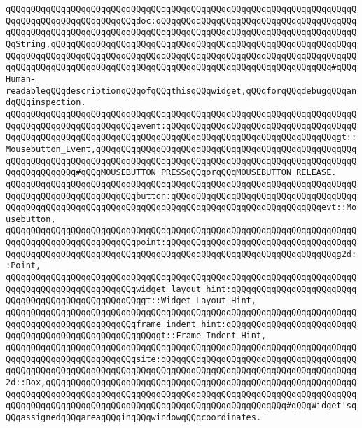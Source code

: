 \verb|qQQqqQQqqQQqqQQqqQQqqQQqqQQqqQQqqQQqqQQqqQQqqQQqqQQqqQQqqQQqqQQqqQQqqQQqqQQqqQQqqQQqqQQqqQQqqQQqdoc:qQQqqQQqqQQqqQQqqQQqqQQqqQQqqQQqqQQqqQQqqQQqqQQqqQQqqQQqqQQqqQQqqQQqqQQqqQQqqQQqqQQqqQQqqQQqqQQqqQQqqQQqqQQqqQQqString,qQQqqQQqqQQqqQQqqQQqqQQqqQQqqQQqqQQqqQQqqQQqqQQqqQQqqQQqqQQqqQQqqQQqqQQqqQQqqQQqqQQqqQQqqQQqqQQqqQQqqQQqqQQqqQQqqQQqqQQqqQQqqQQqqQQqqQQqqQQqqQQqqQQqqQQqqQQqqQQqqQQqqQQqqQQqqQQqqQQqqQQqqQQqqQQqqQQq#qQQqHuman-readableqQQqdescriptionqQQqofqQQqthisqQQqwidget,qQQqforqQQqdebugqQQqandqQQqinspection.|\newline
\verb|qQQqqQQqqQQqqQQqqQQqqQQqqQQqqQQqqQQqqQQqqQQqqQQqqQQqqQQqqQQqqQQqqQQqqQQqqQQqqQQqqQQqqQQqqQQqqQQqevent:qQQqqQQqqQQqqQQqqQQqqQQqqQQqqQQqqQQqqQQqqQQqqQQqqQQqqQQqqQQqqQQqqQQqqQQqqQQqqQQqqQQqqQQqqQQqqQQqqQQqqQQqgt::Mousebutton_Event,qQQqqQQqqQQqqQQqqQQqqQQqqQQqqQQqqQQqqQQqqQQqqQQqqQQqqQQqqQQqqQQqqQQqqQQqqQQqqQQqqQQqqQQqqQQqqQQqqQQqqQQqqQQqqQQqqQQqqQQqqQQqqQQqqQQqqQQq#qQQqMOUSEBUTTON_PRESSqQQqorqQQqMOUSEBUTTON_RELEASE.|\newline
\verb|qQQqqQQqqQQqqQQqqQQqqQQqqQQqqQQqqQQqqQQqqQQqqQQqqQQqqQQqqQQqqQQqqQQqqQQqqQQqqQQqqQQqqQQqqQQqqQQqbutton:qQQqqQQqqQQqqQQqqQQqqQQqqQQqqQQqqQQqqQQqqQQqqQQqqQQqqQQqqQQqqQQqqQQqqQQqqQQqqQQqqQQqqQQqqQQqqQQqqQQqevt::Mousebutton,|\newline
\verb|qQQqqQQqqQQqqQQqqQQqqQQqqQQqqQQqqQQqqQQqqQQqqQQqqQQqqQQqqQQqqQQqqQQqqQQqqQQqqQQqqQQqqQQqqQQqqQQqpoint:qQQqqQQqqQQqqQQqqQQqqQQqqQQqqQQqqQQqqQQqqQQqqQQqqQQqqQQqqQQqqQQqqQQqqQQqqQQqqQQqqQQqqQQqqQQqqQQqqQQqqQQqg2d::Point,|\newline
\verb|qQQqqQQqqQQqqQQqqQQqqQQqqQQqqQQqqQQqqQQqqQQqqQQqqQQqqQQqqQQqqQQqqQQqqQQqqQQqqQQqqQQqqQQqqQQqqQQqwidget_layout_hint:qQQqqQQqqQQqqQQqqQQqqQQqqQQqqQQqqQQqqQQqqQQqqQQqqQQqgt::Widget_Layout_Hint,|\newline
\verb|qQQqqQQqqQQqqQQqqQQqqQQqqQQqqQQqqQQqqQQqqQQqqQQqqQQqqQQqqQQqqQQqqQQqqQQqqQQqqQQqqQQqqQQqqQQqqQQqframe_indent_hint:qQQqqQQqqQQqqQQqqQQqqQQqqQQqqQQqqQQqqQQqqQQqqQQqqQQqqQQqgt::Frame_Indent_Hint,|\newline
\verb|qQQqqQQqqQQqqQQqqQQqqQQqqQQqqQQqqQQqqQQqqQQqqQQqqQQqqQQqqQQqqQQqqQQqqQQqqQQqqQQqqQQqqQQqqQQqqQQqsite:qQQqqQQqqQQqqQQqqQQqqQQqqQQqqQQqqQQqqQQqqQQqqQQqqQQqqQQqqQQqqQQqqQQqqQQqqQQqqQQqqQQqqQQqqQQqqQQqqQQqqQQqqQQqg2d::Box,qQQqqQQqqQQqqQQqqQQqqQQqqQQqqQQqqQQqqQQqqQQqqQQqqQQqqQQqqQQqqQQqqQQqqQQqqQQqqQQqqQQqqQQqqQQqqQQqqQQqqQQqqQQqqQQqqQQqqQQqqQQqqQQqqQQqqQQqqQQqqQQqqQQqqQQqqQQqqQQqqQQqqQQqqQQqqQQqqQQqqQQqqQQq#qQQqWidget'sqQQqassignedqQQqareaqQQqinqQQqwindowqQQqcoordinates.|\newline
